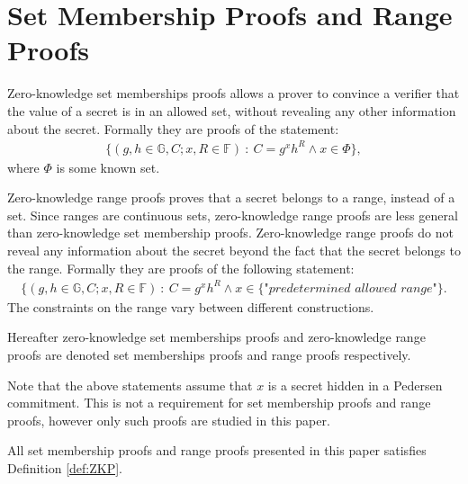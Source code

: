 \section{Set Membership Proofs and Range Proofs}
\label{sec:RF_theory}
Zero-knowledge set memberships proofs allows a prover to convince a verifier that the value of a secret is in an allowed set, without revealing any other information about the secret. Formally they are proofs of the statement:
\begin{align} \label{eq:SM_statement}
    \{(g,h\in\mathds{G},C;x,R\in\mathds{F})\::\:C= g^x h^R \wedge x \in \Phi\},
\end{align}
where $\Phi$ is some known set. 
 
Zero-knowledge range proofs proves that a secret belongs to a range, instead of a set. Since ranges are continuous sets, zero-knowledge range proofs are less general than zero-knowledge set membership proofs.  Zero-knowledge range proofs do not reveal any information about the secret beyond the fact that the secret belongs to the range. Formally they are proofs of the following statement: 
\begin{align} \label{eq:RP_statement}
    \{(g,h\in\mathds{G},C;x,R\in\mathds{F})\::\:C= g^x h^R \wedge x \in \{\textit{"predetermined allowed range"}\}.
\end{align}
The constraints on the range vary between different constructions.

Hereafter zero-knowledge set memberships proofs and zero-knowledge range proofs are denoted set memberships proofs and range proofs respectively. 

Note that the above statements assume that $x$ is a secret hidden in a Pedersen commitment. This is not a requirement for set membership proofs and range proofs, however only such proofs are studied in this paper.

All set membership proofs and range proofs presented in this paper satisfies Definition \ref{def:ZKP}.


